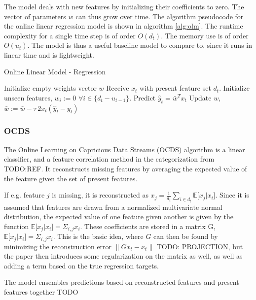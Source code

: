 The model deals with new features by initializing their coefficients to zero.
The vector of parameters $w$ can thus grow over time. The algorithm pseudocode
for the online linear regression model is shown in algorithm \ref{alg:olm}. The
runtime complexity for a single time step is of order $O(d_t)$. The memory use
is of order $O(u_t)$. The model is thus a useful baseline model to compare to,
since it runs in linear time and is lightweight. 

\begin{algorithm}
  \caption{Online Linear Model - Regression}\label{alg:olm}
  \begin{algorithmic}
    \State Initialize empty weights vector $w$
      \State Receive $x_t$ with present feature set $d_t$.
      \State Initialize unseen features, $w_i := 0 \,\, \forall i \in \{d_t - u_{t-1}\}$.
      \State Predict $\hat y_t = \bar w^T x_t$
      \State Update $w$, $\bar w := \bar w - \tau\, 2 x_t (\hat y_t - y_t)$
    \EndFor
  \end{algorithmic}
\end{algorithm}

\subsubsection{OCDS}

The Online Learning on Capricious Data Streams (OCDS) algorithm is a linear
classifier, and a feature correlation method in the categorization from
TODO:REF. It reconstructs missing features by averaging the expected value of
the feature given the set of present features. 

If e.g. feature $j$ is missing, it is reconstructed as $x_j =
\frac{1}{d_t}\sum_{i \in d_t} \mathbb E \lbrack x_j | x_i\rbrack $. Since it is
assumed that features are drawn from a normalized multivariate normal
distribution, the expected value of one feature given another is given by the
function $\mathbb E \lbrack x_j | x_i \rbrack = \Sigma_{i,j}x_i$. These
coefficients are stored in a matrix G, $\mathbb E \lbrack x_j | x_i \rbrack =
\Sigma_{i,j}x_i$. This is the basic idea, where $G$ can then be found by
minimizing the reconstruction error $\|G x_t - x_t\|$ TODO: PROJECTION, but the
paper then introduces some regularization on the matrix as well, as well as
adding a term based on the true regression targets.

The model ensembles predictions based on reconstructed features and present features together TODO

